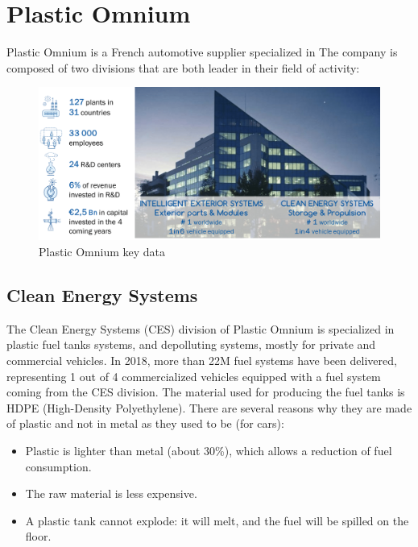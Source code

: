 \chapter{Plastic Omnium}

Plastic Omnium is a French automotive supplier specialized in 
The company is composed of two divisions that are both leader in their field of activity:


\begin{figure}
\centerline{\includegraphics[scale=0.5]{images/appendix_A/PO_key_data.png}}
\caption{Plastic Omnium key data}
\label{fig:Plastic Omnium key data}
\end{figure}




\section{Clean Energy Systems}

The Clean Energy Systems (CES) division of Plastic Omnium is specialized in plastic fuel tanks systems, and depolluting systems, mostly for private and commercial vehicles. In 2018, more than 22M fuel systems have been delivered, representing 1 out of 4 commercialized vehicles equipped with a fuel system coming from the CES division.
The material used for producing the fuel tanks is HDPE (High-Density Polyethylene). There are several reasons why they are made of plastic and not in metal as they used to be (for cars):
\begin{itemize}
    \item Plastic is lighter than metal (about 30\%), which allows a reduction of fuel consumption.
    \item The raw material is less expensive.
    \item A plastic tank cannot explode: it will melt, and the fuel will be spilled on the floor.
\end{itemize}

